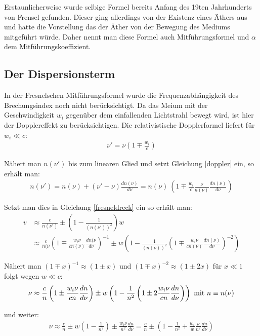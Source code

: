 \documentclass[12pt]{article}
\begin{document}
Erstaunlicherweise wurde selbige Formel bereits Anfang des 19ten Jahrhunderts von Frensel gefunden. Dieser ging allerdings von der Existenz eines 
Äthers aus und hatte die Vorstellung das der Äther von der Bewegung des Mediums mitgeführt würde.
Daher nennt man diese Formel auch Mitführungsformel und $\alpha$ dem Mitführungskoeffizient.


\subsection{Der Dispersionsterm}
In der Fresnelschen Mitführungsformel wurde die Frequenzabhängigkeit des Brechungsindex noch nicht berücksichtigt.
Da das Meium mit der Geschwindigkeit $w_i$ gegenüber dem einfallenden Lichtstrahl bewegt wird, ist hier der Dopplereffekt zu berücksichtigen. Die relativistische Dopplerformel liefert für $w_i \ll c$:
\begin{align}
 \label{doppler}\nu' = \nu \left(1 \mp \frac{w_i}{c}\right)
\end{align}

Nähert man $n(\nu')$ bis zum linearen Glied und setzt Gleichung \ref{doppler} ein, so erhält man:
\begin{align}
 n(\nu')=n(\nu)+(\nu'-\nu)\frac{dn(\nu)}{d\nu}=n(\nu)\ \left(1\mp\frac{w_i}{c}\frac{\nu}{n(\nu)}\frac{dn(\nu)}{d\nu}\right)
\end{align}

Setzt man dies in Gleichung \ref{fresneldreck} ein so erhält man:
\begin{align}
 v &\approx \frac{c}{n(\nu')} \pm \left( 1-\frac{1}{(n(\nu'))^2}\right) w \\
 &\approx \frac{c}{n(\nu} \left( 1 \mp \frac{w_i \nu}{cn(\nu)} \frac{dn(\nu}{d\nu} \right) ^{-1} \pm w \left( 1-\frac{1}{(n(\nu))^2} \left( 1 \mp \frac{w_i \nu}{cn(\nu)}\frac{dn(\nu)}{d\nu} \right) ^{-2} \right)
\end{align}

Nähert man $(1\mp x)^{-1} \approx (1\pm x)$ und $(1\mp x)^{-2} \approx (1\pm 2x)$ für $x \ll 1$ folgt wegen $w\ll c$:
\begin{align}
 \nu \approx \frac{c}{n} \left( 1 \pm \frac{w_i\nu}{cn} \frac{dn}{d\nu} \right) \pm w \left( 1- \frac{1}{n^2} \left( 1 \pm 2 \frac{w_i \nu}{cn} \frac{dn}{d\nu} \right) \right) \textnormal{  mit } n \equiv n(\nu)
\end{align}

und weiter:
\begin{align}
 \nu \approx \frac{c}{n} \pm w \left( 1- \frac{1}{n^2} \right) \pm \frac{w_i \nu}{n^2} \frac{dn}{d\nu} = \frac{c}{n} \pm \left( 1- \frac{1}{n^2} + \frac{w_i}{w} \frac{\nu}{n^2} \frac{dn}{d\nu} \right)
\end{align}
\end{document}
